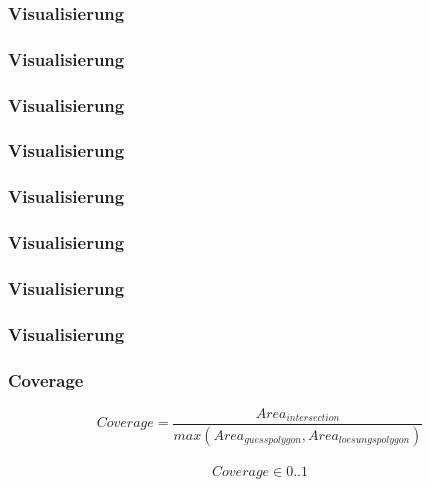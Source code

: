 \begin{frame}
  \frametitle{Visualisierung}
\end{frame}

\begin{frame}
  \frametitle{Visualisierung}
\end{frame}

\begin{frame}
  \frametitle{Visualisierung}
\end{frame}

\begin{frame}
  \frametitle{Visualisierung}
\end{frame}

\begin{frame}
  \frametitle{Visualisierung}
\end{frame}

\begin{frame}
  \frametitle{Visualisierung}
\end{frame}

\begin{frame}
  \frametitle{Visualisierung}
\end{frame}

\begin{frame}
  \frametitle{Visualisierung}
\end{frame}

\begin{frame}
  \frametitle{Coverage}
  \begin{equation*}
    Coverage = \frac{Area_{intersection}}{max(Area_{guesspolygon},Area_{loesungspolygon})}
  \end{equation*}
\\
  \begin{equation*}
    Coverage \in {0..1}
  \end{equation*}
\end{frame}

